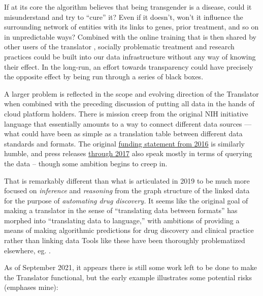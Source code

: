 \documentclass[10pt]{article}
\begin{document}
\begin{multicols}{2}
If at its core the algorithm believes that being transgender is a
disease, could it misunderstand and try to ``cure'' it? Even if it
doesn't, won't it influence the surrounding network of entities with its
links to genes, prior treatment, and so on in unpredictable ways?
Combined with the online training that is then shared by other users of
the translator \cite{consortiumUniversalBiomedicalData2019} ,
socially problematic treatment and research practices could be built
into our data infrastructure without any way of knowing their effect. In
the long-run, an effort towards transparency could have precisely the
opposite effect by being run through a series of black boxes.

A larger problem is reflected in the scope and evolving direction of the
Translator when combined with the preceding discussion of putting all
data in the hands of cloud platform holders. There is mission creep from
the original NIH initiative language that essentially amounts to a way
to connect different data sources --- what could have been as simple as
a translation table between different data standards and formats. The
original
\href{https://web.archive.org/web/20210709100523/https://ncats.nih.gov/news/releases/2016/feasibility-assessment-translator}{funding
statement from 2016} is similarly humble, and press releases
\href{https://web.archive.org/web/20210709171335/https://ncats.nih.gov/pubs/features/translator}{through
2017} also speak mostly in terms of querying the data -- though some
ambition begins to creep in.

That is remarkably different than what is articulated in 2019 \cite{consortiumUniversalBiomedicalData2019}  to be much more focused on
\emph{inference} and \emph{reasoning} from the graph structure of the
linked data for the purpose of \emph{automating drug discovery.} It
seems like the original goal of making a translator in the sense of
``translating data between formats'' has morphed into ``translating data
to language,'' with ambitions of providing a means of making algorithmic
predictions for drug discovery and clinical practice rather than linking
data \cite{hailuNIHfundedProjectAims2019}  Tools like these have
been thoroughly problematized elsewhere, eg. \cite{groteEthicsAlgorithmicDecisionmaking2020, obermeyerDissectingRacialBias2019, panchArtificialIntelligenceAlgorithmic2019, panchInconvenientTruthAI2019} .

As of September 2021, it appears there is still some work left to be
done to make the Translator functional, but the early example
illustrates some potential risks (emphases mine):


\end{multicols}
\end{document}
